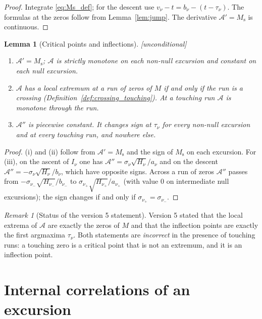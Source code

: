 \documentclass[11pt]{amsart}
\numberwithin{equation}{section}
\theoremstyle{plain}
\newtheorem{lemma}[theorem]{Lemma}
\theoremstyle{definition}
\theoremstyle{remark}
\newtheorem{remark}[theorem]{Remark}
\newcommand{\Ms}{M_{\mathrm{s}}}
\newcommand{\Anet}{\mathcal{A}}
\begin{document}
\begin{proof}
Integrate \eqref{eq:Ms_def}; for the descent use $v_\nu-t=b_\nu-(t-\tau_\nu)$.
The formulas at the zeros follow from Lemma~\ref{lem:jump}. The derivative
$\Anet'=\Ms$ is continuous.
\end{proof}

\begin{lemma}[Critical points and inflections]
\label{lem:critical}
\emph{[unconditional]}
\begin{enumerate}[label=\textup{(\roman*)}]
\item $\Anet'=\Ms$; $\Anet$ is strictly monotone on each non-null excursion
and constant on each null excursion.
\item $\Anet$ has a local extremum at a run of zeros of $M$ if and only if the
run is a crossing (Definition~\ref{def:crossing_touching}). At a touching run
$\Anet$ is monotone through the run.
\item $\Anet''$ is piecewise constant. It changes sign at $\tau_\nu$ for every
non-null excursion and at every touching run, and nowhere else.
\end{enumerate}
\end{lemma}

\begin{proof}
(i) and (ii) follow from $\Anet'=\Ms$ and the sign of $\Ms$ on each
excursion. For (iii), on the ascent of $I_\nu$ one has
$\Anet''=\sigma_\nu\sqrt{H_\nu}/a_\nu$ and on the descent
$\Anet''=-\sigma_\nu\sqrt{H_\nu}/b_\nu$, which have opposite signs. Across a
run of zeros $\Anet''$ passes from $-\sigma_{\nu_-}\sqrt{H_{\nu_-}}/b_{\nu_-}$
to $\sigma_{\nu_+}\sqrt{H_{\nu_+}}/a_{\nu_+}$ (with value $0$ on intermediate
null excursions); the sign changes if and only if
$\sigma_{\nu_+}=\sigma_{\nu_-}$.
\end{proof}

\begin{remark}[Status of the version 5 statement]
\label{rem:critical_v5}
Version 5 stated that the local extrema of $\Anet$ are exactly the zeros of
$M$ and that the inflection points are exactly the first argmaxima $\tau_\nu$.
Both statements are \emph{incorrect} in the presence of touching runs: a
touching zero is a critical point that is not an extremum, and it is an
inflection point.
\end{remark}

\section{Internal correlations of an excursion}
\label{sec:internal_corr}
\end{document}
